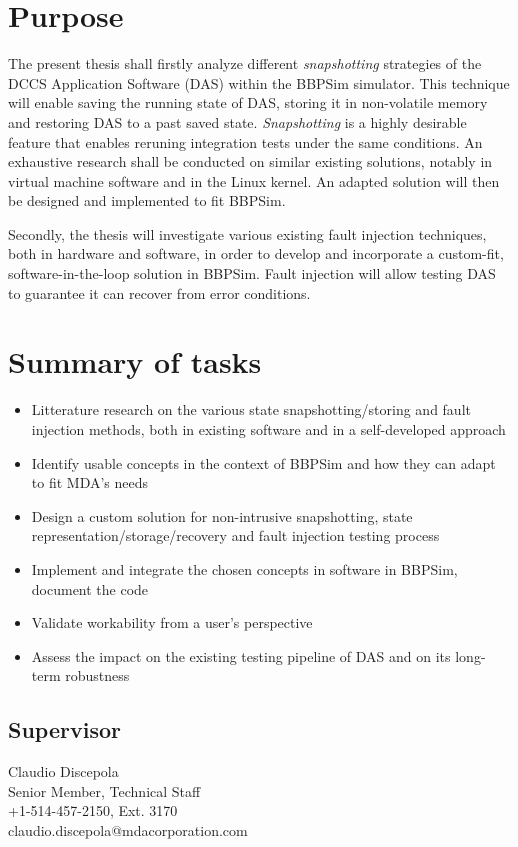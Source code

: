 \documentclass[12pt,english]{rftthesis}
\begin{document}
%
%
\section*{Purpose}\label{sec:purpose}
The present thesis shall firstly analyze different \textit{snapshotting} strategies of the DCCS Application Software (DAS) within the BBPSim simulator. This technique will enable saving the running state of DAS, storing it in non-volatile memory and restoring DAS to a past saved state. \textit{Snapshotting} is a highly desirable feature that enables reruning integration tests under the same conditions. An exhaustive research shall be conducted on similar existing solutions, notably in virtual machine software and in the Linux kernel. An adapted solution will then be designed and implemented to fit BBPSim. 

Secondly, the thesis will investigate various existing fault injection techniques, both in hardware and software, in order to develop and incorporate a custom-fit, software-in-the-loop solution in BBPSim. Fault injection will allow testing DAS to guarantee it can recover from error conditions.
%
%
\section*{Summary of tasks}\label{sec:tasks}
\begin{itemize}
\item Litterature research on the various state snapshotting/storing and fault injection methods, both in existing software and in a self-developed approach
\item Identify usable concepts in the context of BBPSim and how they can adapt to fit MDA's needs 
\item Design a custom solution for non-intrusive snapshotting, state representation/storage/recovery and fault injection testing process 
\item Implement and integrate the chosen concepts in software in BBPSim, document the code
\item Validate workability from a user's perspective
\item Assess the impact on the existing testing pipeline of DAS and on its long-term robustness
\end{itemize}

\subsection*{Supervisor}
\begin{spacing}{1}
Claudio Discepola\\
Senior Member, Technical Staff\\
+1-514-457-2150, Ext. 3170\\
claudio.discepola@mdacorporation.com
\end{spacing}
\end{document}
